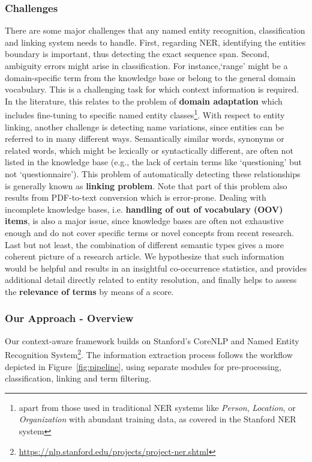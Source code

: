 \subsubsection{Challenges}
There are some major challenges that any named entity recognition, classification and linking system needs to handle.
First, regarding NER, identifying the entities boundary is important, thus detecting the exact sequence span. 
Second, ambiguity errors might arise in classification. For instance,`range' might be a domain-specific term from the knowledge base or belong to the general domain vocabulary. This is a challenging task for which context information is required. 
In the literature, this relates to the problem of \textbf{domain adaptation} which includes fine-tuning to specific named entity classes\footnote{apart from those used in traditional NER systems like \textit{Person}, \textit{Location}, or \textit{Organization} with abundant training data, as covered in the Stanford NER system\cite{finkel2005incorporating}}.
With respect to entity linking, another challenge is detecting name variations, since entities can be referred to in many different ways.
Semantically  similar words, synonyms or related words, which might be lexically or syntactically different, are often not listed in the knowledge base 
(e.g., the lack of certain terms like `questioning' but not `questionnaire').  This problem of automatically detecting these relationships is generally known as \textbf{linking problem}. 
Note that part of this problem also results from PDF-to-text conversion which is error-prone. 
Dealing with incomplete knowledge bases, i.e. \textbf{handling of out of vocabulary (OOV) items}, is also a major issue, since 
knowledge bases are often not exhaustive enough and do not cover specific terms or novel concepts from recent research.
Last but not least, the combination of different semantic types gives a more coherent picture of a research article. We hypothesize that such information would be helpful and results in an insightful co-occurrence statistics, and provides additional detail directly related to entity resolution, and finally helps to assess the \textbf{relevance of terms} by means of a score.

 
\subsubsection{Our Approach - Overview} 
Our context-aware framework builds on Stanford’s CoreNLP and Named Entity Recognition System\footnote{\url{https://nlp.stanford.edu/projects/project-ner.shtml}}. 
The information extraction process follows the workflow depicted in Figure~\ref{fig:pipeline}, using separate modules for pre-processing, classification, linking and term filtering.


